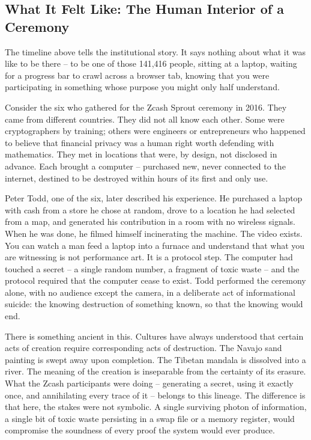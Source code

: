\documentclass[
  11pt,
  openany]{report}
\begin{document}
\subsection{What It Felt Like: The Human Interior of a
Ceremony}\label{what-it-felt-like-the-human-interior-of-a-ceremony}

The timeline above tells the institutional story. It says nothing about what it
was like to be there -- to be one of those 141,416 people, sitting at a laptop,
waiting for a progress bar to crawl across a browser tab, knowing that you were
participating in something whose purpose you might only half understand.

Consider the six who gathered for the Zcash Sprout ceremony in 2016. They came
from different countries. They did not all know each other. Some were
cryptographers by training; others were engineers or entrepreneurs who happened
to believe that financial privacy was a human right worth defending with
mathematics. They met in locations that were, by design, not disclosed in
advance. Each brought a computer -- purchased new, never connected to the
internet, destined to be destroyed within hours of its first and only use.

Peter Todd, one of the six, later described his experience. He purchased a
laptop with cash from a store he chose at random, drove to a location he had
selected from a map, and generated his contribution in a room with no wireless
signals. When he was done, he filmed himself incinerating the machine. The video
exists. You can watch a man feed a laptop into a furnace and understand that
what you are witnessing is not performance art. It is a protocol step. The
computer had touched a secret -- a single random number, a fragment of toxic
waste -- and the protocol required that the computer cease to exist. Todd
performed the ceremony alone, with no audience except the camera, in a
deliberate act of informational suicide: the knowing destruction of something
known, so that the knowing would end.

There is something ancient in this. Cultures have always understood that certain
acts of creation require corresponding acts of destruction. The Navajo sand
painting is swept away upon completion. The Tibetan mandala is dissolved into a
river. The meaning of the creation is inseparable from the certainty of its
erasure. What the Zcash participants were doing -- generating a secret, using it
exactly once, and annihilating every trace of it -- belongs to this lineage. The
difference is that here, the stakes were not symbolic. A single surviving photon
of information, a single bit of toxic waste persisting in a swap file or a
memory register, would compromise the soundness of every proof the system would
ever produce.
\end{document}
